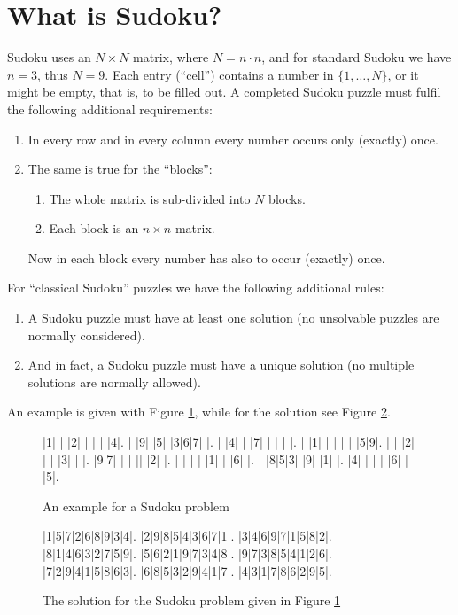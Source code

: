 \documentclass[11pt]{report}
\begin{document}
\section{What is Sudoku?}
\label{sec:whatissudoku}

Sudoku uses an $N \times N$ matrix, where $N = n \cdot n$, and for standard Sudoku we have $n = 3$, thus $N = 9$. Each entry (``cell'') contains a number in $\{1, \dots, N\}$, or it might be empty, that is, to be filled out. A completed Sudoku puzzle must fulfil the following additional requirements:
\begin{enumerate}
\item In every row and in every column every number occurs only (exactly) once.
\item The same is true for the ``blocks'':
\begin{enumerate}
\item The whole matrix is sub-divided into $N$ blocks.
\item Each block is an $n \times n$ matrix.
\end{enumerate}
Now in each block every number has also to occur (exactly) once.
\end{enumerate}
For ``classical Sudoku'' puzzles we have the following additional rules:
\begin{enumerate}
\item A Sudoku puzzle must have at least one solution (no unsolvable puzzles are normally considered).
\item And in fact, a Sudoku puzzle must have a unique solution (no multiple solutions are normally allowed).
\end{enumerate}
An example is given with Figure \ref{sudokuEx}, while for the solution see Figure \ref{fig:solutionsudokuEx}.

\begin{figure}[htbp]
\begin{sudoku}
 |1| | |2| | | | |4|.
 | |9| |5| |3|6|7| |.
 | |4| | |7| | | | |.
 | |1| | | | | |5|9|.
 | | |2| | | |3| | |.
 |9|7| | | || |2| |.
 | | | | |1| | |6| |.
 | |8|5|3| |9| |1| |.
 |4| | | | |6| | |5|.
\end{sudoku}
\caption{An example for a Sudoku problem}
\label{sudokuEx}
\end{figure}

\begin{figure}[htbp]
\begin{sudoku}
  |1|5|7|2|6|8|9|3|4|.
  |2|9|8|5|4|3|6|7|1|.
  |3|4|6|9|7|1|5|8|2|.
  |8|1|4|6|3|2|7|5|9|.
  |5|6|2|1|9|7|3|4|8|.
  |9|7|3|8|5|4|1|2|6|.
  |7|2|9|4|1|5|8|6|3|.
  |6|8|5|3|2|9|4|1|7|.
  |4|3|1|7|8|6|2|9|5|.
\end{sudoku}
\caption{The solution for the Sudoku problem given in Figure \ref{sudokuEx}}
\label{fig:solutionsudokuEx}
\end{figure}
\end{document}
